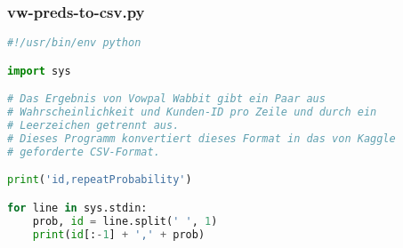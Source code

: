 \subsubsection{vw-preds-to-csv.py}
\label{code:vw-preds-to-csv}
\begin{lstlisting}[language=Python]
#!/usr/bin/env python

import sys

# Das Ergebnis von Vowpal Wabbit gibt ein Paar aus 
# Wahrscheinlichkeit und Kunden-ID pro Zeile und durch ein
# Leerzeichen getrennt aus.
# Dieses Programm konvertiert dieses Format in das von Kaggle
# geforderte CSV-Format.

print('id,repeatProbability')

for line in sys.stdin:
	prob, id = line.split(' ', 1)
	print(id[:-1] + ',' + prob)
\end{lstlisting}
	
	